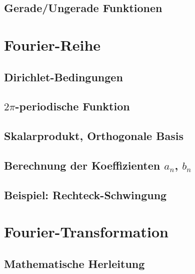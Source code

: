 \documentclass[a4paper, 11pt, accentcolor = tud3b]{tudreport}
\begin{document}
			\subsection{Gerade/Ungerade Funktionen} %

		\section{Fourier-Reihe} %

			\subsection{Dirichlet-Bedingungen} %

			\subsection{\(2\pi\)-periodische Funktion} %

			\subsection{Skalarprodukt, Orthogonale Basis} %

			\subsection{Berechnung der Koeffizienten \(a_n\), \(b_n\)} %

			\subsection{Beispiel: Rechteck-Schwingung} %

		\section{Fourier-Transformation} %

			\subsection{Mathematische Herleitung} %
\end{document}
